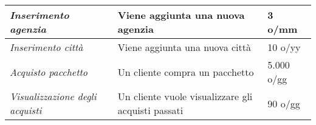\begin{center}
\begin{tabularx}{\textwidth}{L X p{0.22\textwidth}}
        \\\midrule
        \emph{Inserimento agenzia} & Viene aggiunta una nuova agenzia & 3 o/mm
        \\\midrule
        \emph{Inserimento città} & Viene aggiunta una nuova città & 10 o/yy
        \\\midrule
        \emph{Acquisto pacchetto} & Un cliente compra un pacchetto & 5.000 o/gg
        \\\midrule
        \emph{Visualizzazione degli acquisti} & Un cliente vuole visualizzare gli acquisti passati & 90 o/gg
        \\
    \end{tabularx}
\end{center}